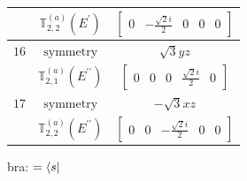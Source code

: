 \documentclass[fleqn,8pt,landscape]{jsarticle}
\begin{document}
\begin{longtable}{ccc}
$  $ & $ \mathbb{T}_{2,2}^{(a)}(E^{\prime}) $ & $ \begin{bmatrix} 0 & - \frac{\sqrt{2} i}{2} & 0 & 0 & 0 \end{bmatrix} $ \\ \hline
$ 16 $ & $ \text{symmetry} $ & $ \sqrt{3} y z $ \\
$  $ & $ \mathbb{T}_{2,1}^{(a)}(E^{\prime\prime}) $ & $ \begin{bmatrix} 0 & 0 & 0 & \frac{\sqrt{2} i}{2} & 0 \end{bmatrix} $ \\ \hline
$ 17 $ & $ \text{symmetry} $ & $ - \sqrt{3} x z $ \\
$  $ & $ \mathbb{T}_{2,2}^{(a)}(E^{\prime\prime}) $ & $ \begin{bmatrix} 0 & 0 & - \frac{\sqrt{2} i}{2} & 0 & 0 \end{bmatrix} $ \\ \hline
\end{longtable}
bra: $=\bra{s}$
\end{document}

